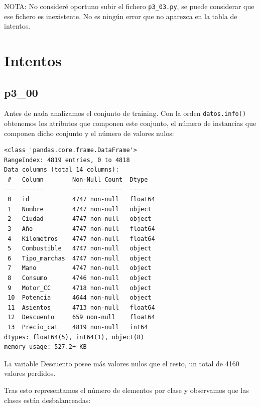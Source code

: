 \documentclass[a4]{article}
\begin{document}
\vspace{5mm}
NOTA: No consideré oportuno subir el fichero \texttt{p3\_03.py}, se puede considerar que ese fichero es inexistente. No es ningún error que no aparezca en la tabla de intentos.

\newpage
\section{Intentos}

\subsection{p3\_00}

Antes de nada analizamos el conjunto de training. Con la orden \texttt{datos.info()} obtenemos los atributos que componen este conjunto, el número de instancias que componen dicho conjunto y el número de valores nulos:

\begin{verbatim}
<class 'pandas.core.frame.DataFrame'>
RangeIndex: 4819 entries, 0 to 4818
Data columns (total 14 columns):
 #   Column        Non-Null Count  Dtype  
---  ------        --------------  -----  
 0   id            4747 non-null   float64
 1   Nombre        4747 non-null   object 
 2   Ciudad        4747 non-null   object 
 3   Año           4747 non-null   float64
 4   Kilometros    4747 non-null   float64
 5   Combustible   4747 non-null   object 
 6   Tipo_marchas  4747 non-null   object 
 7   Mano          4747 non-null   object 
 8   Consumo       4746 non-null   object 
 9   Motor_CC      4718 non-null   object 
 10  Potencia      4644 non-null   object 
 11  Asientos      4713 non-null   float64
 12  Descuento     659 non-null    float64
 13  Precio_cat    4819 non-null   int64  
dtypes: float64(5), int64(1), object(8)
memory usage: 527.2+ KB
\end{verbatim}

La variable Descuento posee más valores nulos que el resto, un total de 4160 valores perdidos.

Tras esto representamos el número de elementos por clase y observamos que las clases están desbalanceadas:

\begin{figure}[H]
  \centering
\end{figure}
\end{document}
